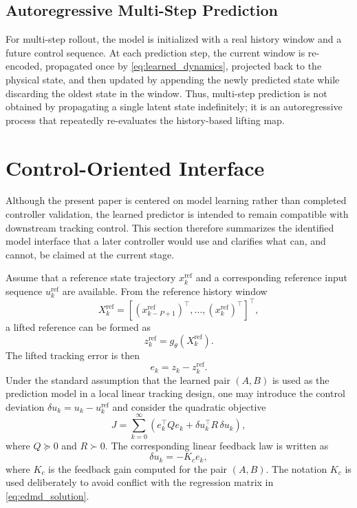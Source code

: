 \documentclass[journal]{IEEEtran}
\begin{document}
\subsection{Autoregressive Multi-Step Prediction}

For multi-step rollout, the model is initialized with a real history window and a future control sequence. At each prediction step, the current window is re-encoded, propagated once by \eqref{eq:learned_dynamics}, projected back to the physical state, and then updated by appending the newly predicted state while discarding the oldest state in the window. Thus, multi-step prediction is not obtained by propagating a single latent state indefinitely; it is an autoregressive process that repeatedly re-evaluates the history-based lifting map.

\section{Control-Oriented Interface}
\label{sec:control}

Although the present paper is centered on model learning rather than completed controller validation, the learned predictor is intended to remain compatible with downstream tracking control. This section therefore summarizes the identified model interface that a later controller would use and clarifies what can, and cannot, be claimed at the current stage.

Assume that a reference state trajectory $x_k^{\mathrm{ref}}$ and a corresponding reference input sequence $u_k^{\mathrm{ref}}$ are available. From the reference history window
\begin{equation}
    X_k^{\mathrm{ref}} = [(x_{k-P+1}^{\mathrm{ref}})^\top,\ldots,(x_k^{\mathrm{ref}})^\top]^\top,
\end{equation}
a lifted reference can be formed as
\begin{equation}
    z_k^{\mathrm{ref}} = g_\theta(X_k^{\mathrm{ref}}).
    \label{eq:reference_lifting}
\end{equation}
The lifted tracking error is then
\begin{equation}
    e_k = z_k - z_k^{\mathrm{ref}}.
    \label{eq:tracking_error}
\end{equation}
Under the standard assumption that the learned pair $(A,B)$ is used as the prediction model in a local linear tracking design, one may introduce the control deviation $\delta u_k=u_k-u_k^{\mathrm{ref}}$ and consider the quadratic objective
\begin{equation}
    J = \sum_{k=0}^{\infty}
    \left(e_k^\top Q e_k + \delta u_k^\top R\,\delta u_k\right),
    \label{eq:lqr_objective}
\end{equation}
where $Q\succeq 0$ and $R\succ 0$. The corresponding linear feedback law is written as
\begin{equation}
    \delta u_k = -K_c e_k,
    \label{eq:lqr_control}
\end{equation}
where $K_c$ is the feedback gain computed for the pair $(A,B)$. The notation $K_c$ is used deliberately to avoid conflict with the regression matrix in \eqref{eq:edmd_solution}.
\end{document}
